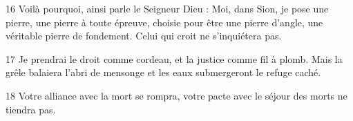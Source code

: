 
16 Voilà pourquoi, ainsi parle le Seigneur Dieu : Moi, dans Sion, je pose une pierre, une pierre à toute épreuve, choisie pour être une pierre d’angle, une véritable pierre de fondement. Celui qui croit ne s’inquiétera pas.

17 Je prendrai le droit comme cordeau, et la justice comme fil à plomb. Mais la grêle balaiera l’abri de mensonge et les eaux submergeront le refuge caché.

18 Votre alliance avec la mort se rompra, votre pacte avec le séjour des morts ne tiendra pas.